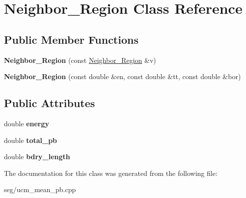 \hypertarget{class_neighbor___region}{\section{Neighbor\-\_\-\-Region Class Reference}
\label{class_neighbor___region}
}
\subsection*{Public Member Functions}
\begin{DoxyCompactItemize}
\item 
\hypertarget{class_neighbor___region_aece3de2323df70036dfeff71aea536eb}{{\bfseries Neighbor\-\_\-\-Region} (const \hyperlink{class_neighbor___region}{Neighbor\-\_\-\-Region} \&v)}\label{class_neighbor___region_aece3de2323df70036dfeff71aea536eb}

\item 
\hypertarget{class_neighbor___region_a30a4f977e4353bcd5c18bc8c3958d4a3}{{\bfseries Neighbor\-\_\-\-Region} (const double \&en, const double \&tt, const double \&bor)}\label{class_neighbor___region_a30a4f977e4353bcd5c18bc8c3958d4a3}

\end{DoxyCompactItemize}
\subsection*{Public Attributes}
\begin{DoxyCompactItemize}
\item 
\hypertarget{class_neighbor___region_aab19490469739da79d98b7cae51055f1}{double {\bfseries energy}}\label{class_neighbor___region_aab19490469739da79d98b7cae51055f1}

\item 
\hypertarget{class_neighbor___region_a480ba1ce31757f37d670f5b76716c4bd}{double {\bfseries total\-\_\-pb}}\label{class_neighbor___region_a480ba1ce31757f37d670f5b76716c4bd}

\item 
\hypertarget{class_neighbor___region_a368586957c3d1cdea7a23222614bcc8b}{double {\bfseries bdry\-\_\-length}}\label{class_neighbor___region_a368586957c3d1cdea7a23222614bcc8b}

\end{DoxyCompactItemize}


The documentation for this class was generated from the following file\-:\begin{DoxyCompactItemize}
\item 
seg/ucm\-\_\-mean\-\_\-pb.\-cpp\end{DoxyCompactItemize}
